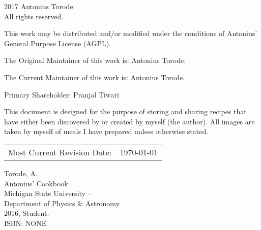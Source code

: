 \pagestyle{empty}

\begingroup
\footnotesize
\parindent 0pt
\parskip \baselineskip
\textcopyright{} 2017 Antonius Torode \\
All rights reserved.

This work may be distributed and/or modified under the conditions of Antonius’ General Purpose License (AGPL).

The Original Maintainer of this work is: Antonius Torode.

The Current Maintainer of this work is: Antonius Torode.

Primary Shareholder: Pranjal Tiwari

This document is designed for the purpose of storing and sharing recipes that have either been discovered by or created by myself (the author). All images are taken by myself of meals I have prepared unless otherwise stated.

\begin{center}
\begin{tabular}{ll}
Most Current Revision Date: &  \today 
\end{tabular}
\end{center}

\vfill


Torode, A.\\
\hspace*{2em} Antonius' Cookbook \\
\hspace*{2em} Michigan State University -- \\
\hspace*{2em} Department of Physics \& Astronomy. \\
\hspace*{2em} 2016, Student. \\
\hspace*{2em} ISBN: NONE \\



\endgroup
\clearpage